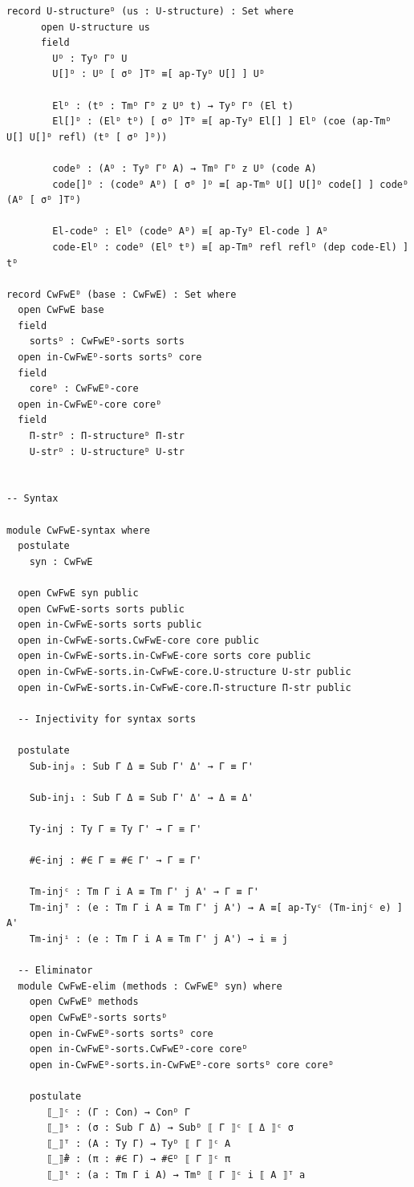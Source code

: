 \documentclass[10pt,a4paper]{article}
\theoremstyle{definition}
\theoremstyle{remark}
\begin{document}
{\begin{Verbatim}[breaklines=true,breakanywhere=true,fontsize=\scriptsize]
    record U-structureᴰ (us : U-structure) : Set where
      open U-structure us
      field
        Uᴰ : Tyᴰ Γᴰ U
        U[]ᴰ : Uᴰ [ σᴰ ]Tᴰ ≡[ ap-Tyᴰ U[] ] Uᴰ

        Elᴰ : (tᴰ : Tmᴰ Γᴰ z Uᴰ t) → Tyᴰ Γᴰ (El t)
        El[]ᴰ : (Elᴰ tᴰ) [ σᴰ ]Tᴰ ≡[ ap-Tyᴰ El[] ] Elᴰ (coe (ap-Tmᴰ U[] U[]ᴰ refl) (tᴰ [ σᴰ ]ᴰ))

        codeᴰ : (Aᴰ : Tyᴰ Γᴰ A) → Tmᴰ Γᴰ z Uᴰ (code A)
        code[]ᴰ : (codeᴰ Aᴰ) [ σᴰ ]ᴰ ≡[ ap-Tmᴰ U[] U[]ᴰ code[] ] codeᴰ (Aᴰ [ σᴰ ]Tᴰ)

        El-codeᴰ : Elᴰ (codeᴰ Aᴰ) ≡[ ap-Tyᴰ El-code ] Aᴰ
        code-Elᴰ : codeᴰ (Elᴰ tᴰ) ≡[ ap-Tmᴰ refl reflᴰ (dep code-El) ] tᴰ

record CwFwEᴰ (base : CwFwE) : Set where
  open CwFwE base
  field
    sortsᴰ : CwFwEᴰ-sorts sorts
  open in-CwFwEᴰ-sorts sortsᴰ core
  field
    coreᴰ : CwFwEᴰ-core
  open in-CwFwEᴰ-core coreᴰ
  field
    Π-strᴰ : Π-structureᴰ Π-str
    U-strᴰ : U-structureᴰ U-str


-- Syntax

module CwFwE-syntax where
  postulate
    syn : CwFwE

  open CwFwE syn public
  open CwFwE-sorts sorts public
  open in-CwFwE-sorts sorts public
  open in-CwFwE-sorts.CwFwE-core core public
  open in-CwFwE-sorts.in-CwFwE-core sorts core public
  open in-CwFwE-sorts.in-CwFwE-core.U-structure U-str public
  open in-CwFwE-sorts.in-CwFwE-core.Π-structure Π-str public

  -- Injectivity for syntax sorts

  postulate
    Sub-inj₀ : Sub Γ Δ ≡ Sub Γ' Δ' → Γ ≡ Γ'

    Sub-inj₁ : Sub Γ Δ ≡ Sub Γ' Δ' → Δ ≡ Δ'

    Ty-inj : Ty Γ ≡ Ty Γ' → Γ ≡ Γ'

    #∈-inj : #∈ Γ ≡ #∈ Γ' → Γ ≡ Γ'

    Tm-injᶜ : Tm Γ i A ≡ Tm Γ' j A' → Γ ≡ Γ'
    Tm-injᵀ : (e : Tm Γ i A ≡ Tm Γ' j A') → A ≡[ ap-Tyᶜ (Tm-injᶜ e) ] A'
    Tm-injⁱ : (e : Tm Γ i A ≡ Tm Γ' j A') → i ≡ j

  -- Eliminator
  module CwFwE-elim (methods : CwFwEᴰ syn) where
    open CwFwEᴰ methods
    open CwFwEᴰ-sorts sortsᴰ
    open in-CwFwEᴰ-sorts sortsᴰ core
    open in-CwFwEᴰ-sorts.CwFwEᴰ-core coreᴰ
    open in-CwFwEᴰ-sorts.in-CwFwEᴰ-core sortsᴰ core coreᴰ

    postulate
       ⟦_⟧ᶜ : (Γ : Con) → Conᴰ Γ
       ⟦_⟧ˢ : (σ : Sub Γ Δ) → Subᴰ ⟦ Γ ⟧ᶜ ⟦ Δ ⟧ᶜ σ
       ⟦_⟧ᵀ : (A : Ty Γ) → Tyᴰ ⟦ Γ ⟧ᶜ A
       ⟦_⟧̂# : (π : #∈ Γ) → #∈ᴰ ⟦ Γ ⟧ᶜ π
       ⟦_⟧ᵗ : (a : Tm Γ i A) → Tmᴰ ⟦ Γ ⟧ᶜ i ⟦ A ⟧ᵀ a


\end{Verbatim}}
\end{document}
